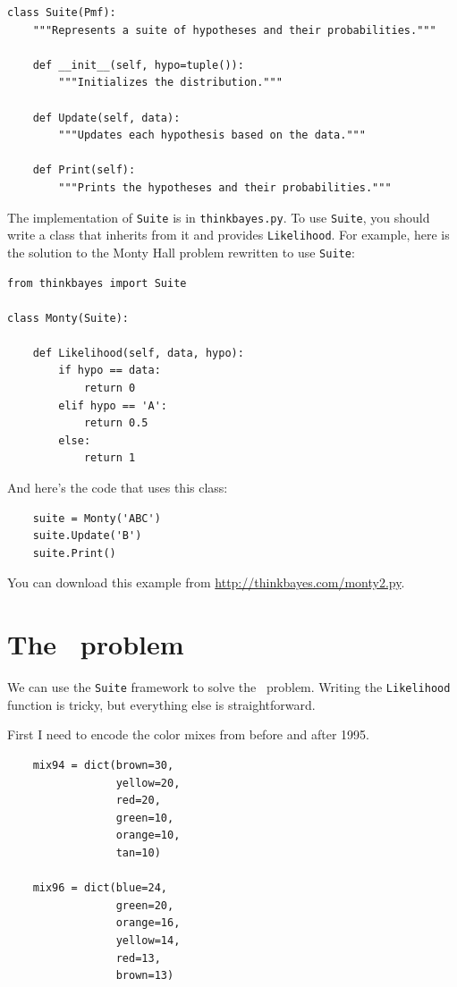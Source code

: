 \documentclass[12pt]{book}
\begin{document}
\begin{verbatim}
class Suite(Pmf):
    """Represents a suite of hypotheses and their probabilities."""

    def __init__(self, hypo=tuple()):
        """Initializes the distribution."""

    def Update(self, data):
        """Updates each hypothesis based on the data."""

    def Print(self):
        """Prints the hypotheses and their probabilities."""
\end{verbatim}

The implementation of \verb"Suite" is in \verb"thinkbayes.py".  To use
\verb"Suite", you should write a class that inherits from it and
provides \verb"Likelihood".  For example, here is the solution to the
Monty Hall problem rewritten to use \verb"Suite":

\begin{verbatim}
from thinkbayes import Suite

class Monty(Suite):

    def Likelihood(self, data, hypo):
        if hypo == data:
            return 0
        elif hypo == 'A':
            return 0.5
        else:
            return 1
\end{verbatim}

And here's the code that uses this class:

\begin{verbatim}
    suite = Monty('ABC')
    suite.Update('B')
    suite.Print()
\end{verbatim}

You can download this example from
\url{http://thinkbayes.com/monty2.py}.


\section{The \MM~problem}


We can use the \verb"Suite" framework to solve the \MM~problem.
Writing the \verb"Likelihood" function is tricky, but everything
else is straightforward.

First I need to encode the color mixes from before and
after 1995.

\begin{verbatim}
    mix94 = dict(brown=30,
                 yellow=20,
                 red=20,
                 green=10,
                 orange=10,
                 tan=10)

    mix96 = dict(blue=24,
                 green=20,
                 orange=16,
                 yellow=14,
                 red=13,
                 brown=13)
\end{verbatim}
\end{document}
